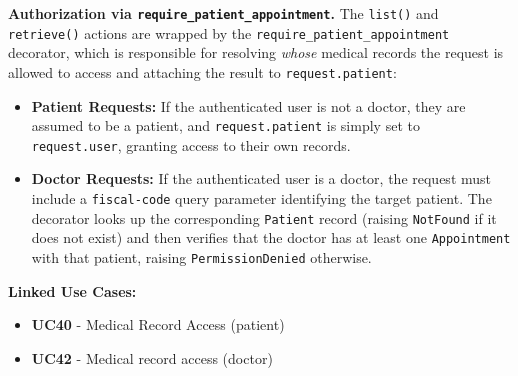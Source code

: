 \vspace{0.2cm}
\noindent\textbf{Authorization via \texttt{require\_patient\_appointment}.} The \texttt{list()} and \texttt{retrieve()} actions are wrapped by the \texttt{require\_patient\_appointment} decorator, which is responsible for resolving \emph{whose} medical records the request is allowed to access and attaching the result to \texttt{request.patient}:

\begin{itemize}
    \item \textbf{Patient Requests:} If the authenticated user is not a doctor, they are assumed to be a patient, and \texttt{request.patient} is simply set to \texttt{request.user}, granting access to their own records.
    \item \textbf{Doctor Requests:} If the authenticated user is a doctor, the request must include a \texttt{fiscal-code} query parameter identifying the target patient. The decorator looks up the corresponding \texttt{Patient} record (raising \texttt{NotFound} if it does not exist) and then verifies that the doctor has at least one \texttt{Appointment} with that patient, raising \texttt{PermissionDenied} otherwise.
\end{itemize}

\vspace{0.2cm}

\vspace{0.5cm}
\noindent\textbf{Linked Use Cases:}
\begin{itemize}
    \item \textbf{UC40} - Medical Record Access (patient)
    \item \textbf{UC42} - Medical record access (doctor)
\end{itemize}